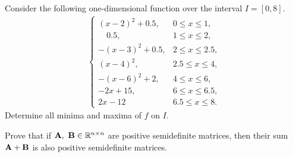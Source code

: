 \documentclass{ExerciseSheet}
\newif\ifsolutions
\begin{document}


\vskip 0.5cm
\begin{problem}
  Consider the following one-dimensional function over the interval $I=[0, 8].$
    \begin{align*}    
      \begin{cases}
       (x-2)^2+0.5,  &0\leq x \leq 1, \\
           \quad   0.5,& 1\leq x \leq 2, \\
       -(x-3)^2+0.5, & 2\leq x \leq 2.5, \\
        (x-4)^2, & 2.5\leq x \leq 4, \\
       -(x-6)^2+ 2, &4\leq x \leq 6, \\
         -2x + 15, & 6\leq x \leq 6.5, \\
          2x - 12 & 6.5\leq x \leq 8.
      \end{cases}
   \end{align*}
   Determine all   minima and maxima of $f$ on $I.$
\end{problem}



\ifsolutions
\vskip 0.3cm
\begin{solution}
\end{solution}
\fi


\vskip 0.5cm
\begin{problem}
    Prove that if $\Abf,~\Bbf\in \R^{n\times n}$ are positive semidefinite matrices, then their sum ${\mathbf A}+{\mathbf B}$ is also positive semidefinite matrices.
    
\end{problem}



\ifsolutions
\vskip 0.3cm
\begin{solution}
 Assume $\Abf,~\Bbf\in \R^{n\times n}$ are positive semidefinite and let $\xbf\in \R^n\backslash\{0\}.$ Since $\Abf$ and $\Bbf$ are positive semidefinite we have
    \begin{align}\label{positive semidefinite}
        \begin{cases}
            \xbf^T\Abf\xbf\geq 0 \\
            \xbf^T\Bbf\xbf\geq 0
        \end{cases}
    \end{align}
 On the other hand
 \begin{align*}
     \xbf^T(\Abf+\Bbf)\xbf = \xbf^T\Abf\xbf+ \xbf^T\Bbf\xbf
 \end{align*}
 substituting $\eqref{positive semidefinite}$ into the above yields
    \begin{align*}
     \xbf^T(\Abf+\Bbf)\xbf \geq 0
 \end{align*}
\end{solution}
\fi
\end{document}
